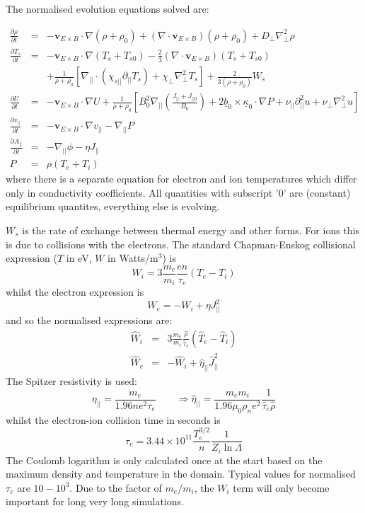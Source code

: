 \documentclass[12pt]{article}
\newcommand{\deriv}[2]{\ensuremath{\frac{\partial #1}{\partial #2}}}
\newcommand{\Vec}[1]{\ensuremath{\mathbf{#1}}}
\newcommand{\bvec}{\ensuremath{\underline{b}}}
\newcommand{\kvec}{\ensuremath{\underline{\kappa}}}
\newcommand{\apar}{\ensuremath{A_{||}}}
\begin{document}
The normalised evolution equations solved are:

\begin{eqnarray*}
  \deriv{\rho}{t} &=& -\Vec{v}_{E\times B}\cdot\nabla\left(\rho + \rho_0\right) + \left(\nabla\cdot\Vec{v}_{E\times B}\right)\left(\rho + \rho_0\right) + D_\perp\nabla_\perp^2\rho \\
  \deriv{T_s}{t} &=& -\Vec{v}_{E\times B}\cdot\nabla\left(T_s + T_{s0}\right) - \frac{2}{3}\left(\nabla\cdot\Vec{v}_{E\times B}\right)\left(T_s + T_{s0}\right) \\
  &&+ \frac{1}{\rho + \rho_0}\left[ \nabla_{||}\cdot\left(\chi_{s||}\partial_{||}T_s\right) + \chi_\perp\nabla_\perp^2T_s\right] + \frac{2}{3\left(\rho+\rho_0\right)}W_s \\
  \deriv{U}{t} &=& -\Vec{v}_{E\times B}\cdot\nabla U + \frac{1}{\rho+\rho_0}\left[ B_0^2\nabla_{||}\left(\frac{J_{||}+J_{||0}}{B_0}\right) + 2\bvec_0\times\kvec_0\cdot\nabla P + \nu_{||}\partial_{||}^2u + \nu_\perp\nabla_\perp^2u\right] \\
\deriv{v_{||}}{t} &=& -\Vec{v}_{E\times B}\cdot\nabla v_{||} - \nabla_{||} P \\
\deriv{\apar}{t} &=& -\nabla_{||}\phi - \eta J_{||} \\
P &=& \rho\left(T_e + T_i\right)
\end{eqnarray*}
where there is a separate equation for electron and ion temperatures which
differ only in conductivity coefficients. All quantities with subscript '0'
are (constant) equilibrium quantites, everything else is evolving.

$W_s$ is the rate of exchange between thermal energy and other forms. For
ions this is due to collisions with the electrons. The standard Chapman-Enskog
collisional expression ($T$ in eV, $W$ in Watts/m$^3$) is
\[
W_i = 3\frac{m_e}{m_i}\frac{en}{\tau_e}\left(T_e - T_i\right)
\]
whilst the electron expression is
\[
W_e = -W_i + \eta J_{||}^2
\]
and so the normalised expressions are:
\begin{eqnarray*}
  \hat{W}_i &=& 3\frac{m_e}{m_i} \frac{\hat{\rho}}{\hat{\tau}_e}\left(\hat{T}_e - \hat{T}_i\right) \\
  \hat{W}_e &=& -\hat{W}_i + \hat{\eta}_{||}\hat{J}_{||}^2
\end{eqnarray*}
The Spitzer resistivity is used:
\[
\eta_{||} = \frac{m_e}{1.96ne^2\tau_e} \qquad \Rightarrow \hat{\eta}_{||} = \frac{m_em_i}{1.96\mu_0\rho_ne^2}\frac{1}{\hat{\tau}_e\hat{\rho}}
\]
whilst the electron-ion collision time in seconds is
\[
\tau_e = 3.44\times 10^{11}\frac{T_e^{3/2}}{n}\frac{1}{Z_i\ln\Lambda}
\]
The Coulomb logarithm is only calculated once at the start based on the maximum density and temperature in the domain. Typical values for normalised $\tau_e$ are $10 - 10^3$. Due to the factor of $m_e/m_i$, the $W_i$ term will only become important for long very long simulations. 
\end{document}
